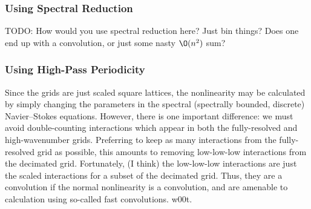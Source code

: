 \documentclass[12pt,showpacs,showkeys,%
amsfonts,amsmath,onecolumn,
floatfix,aps,superscriptaddress]{revtex4}
\begin{document}
\subsubsection{Using Spectral Reduction}

TODO: How would you use spectral reduction here?  Just bin things?
Does one end up with a convolution, or just some nasty $\O(n^2)$ sum?

\subsubsection{Using High-Pass Periodicity}

Since the grids are just scaled square lattices, the nonlinearity may
be calculated by simply changing the parameters in the spectral
(spectrally bounded, discrete) Navier--Stokes equations.  However,
there is one important difference: we must avoid double-counting
interactions which appear in both the fully-resolved and
high-wavenumber grids.  Preferring to keep as many interactions from
the fully-resolved grid as possible, this amounts to removing
low-low-low interactions from the decimated grid.  Fortunately, (I
think) the low-low-low interactions are just the scaled interactions
for a subset of the decimated grid.  Thus, they are a convolution if
the normal nonlinearity is a convolution, and are amenable to
calculation using so-called fast convolutions.  w00t.
\end{document}
